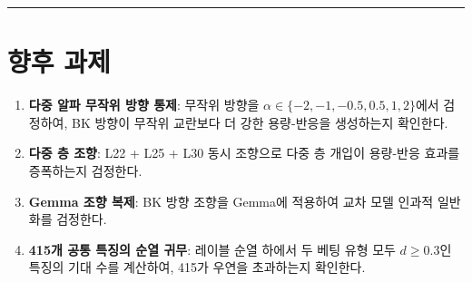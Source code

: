 \documentclass[11pt,a4paper]{article}
\begin{document}
\bigskip\hrule\bigskip

\section{향후 과제}

\begin{enumerate}[leftmargin=2em]
    \item \textbf{다중 알파 무작위 방향 통제}: 무작위 방향을 $\alpha \in \{-2, -1, -0.5, 0.5, 1, 2\}$에서 검정하여, BK 방향이 무작위 교란보다 더 강한 용량-반응을 생성하는지 확인한다.
    \item \textbf{다중 층 조향}: L22 + L25 + L30 동시 조향으로 다중 층 개입이 용량-반응 효과를 증폭하는지 검정한다.
    \item \textbf{Gemma 조향 복제}: BK 방향 조향을 Gemma에 적용하여 교차 모델 인과적 일반화를 검정한다.
    \item \textbf{415개 공통 특징의 순열 귀무}: 레이블 순열 하에서 두 베팅 유형 모두 $d$$\geq$0.3인 특징의 기대 수를 계산하여, 415가 우연을 초과하는지 확인한다.
\end{enumerate}
\end{document}
